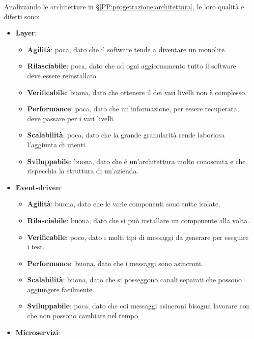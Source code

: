         Analizzando le architetture in \S\ref{PP:progettazione:architettura}, le loro qualità e difetti sono:
        \begin{itemize}
            \item \textbf{Layer}:
                \begin{itemize}
                    \item \textbf{Agilità}: poca, dato che il software tende a diventare un monolite.
                    \item \textbf{Rilasciabile}: poca, dato che ad ogni aggiornamento tutto il software deve essere reinstallato.
                    \item \textbf{Verificabile}: buona, dato che ottenere il  dei vari livelli non è complesso.
                    \item \textbf{Performance}: poca, dato che un'informazione, per essere recuperata, deve passare per i vari livelli.
                    \item \textbf{Scalabilità}: poca, dato che la grande granularità rende laboriosa l'aggiunta di utenti.
                    \item \textbf{Sviluppabile}: buona, dato che è un'architettura molto conosciuta e che rispecchia la struttura di un'azienda.
                \end{itemize}
            \item \textbf{Event-driven}:
                \begin{itemize}
                    \item \textbf{Agilità}: buona, dato che le varie componenti sono tutte isolate.
                    \item \textbf{Rilasciabile}: buona, dato che si può installare un componente alla volta.
                    \item \textbf{Verificabile}: poco, dato i molti tipi di messaggi da generare per eseguire i test.
                    \item \textbf{Performance}: buona, dato che i messaggi sono asincroni.
                    \item \textbf{Scalabilità}: buona, dato che si posseggono canali separati che possono aggiungere facilmente.
                    \item \textbf{Sviluppabile}: poca, dato che coi messaggi asincroni bisogna lavorare con  che non possono cambiare nel tempo.
                \end{itemize}
            \item \textbf{Microservizi}:

\end{itemize}
